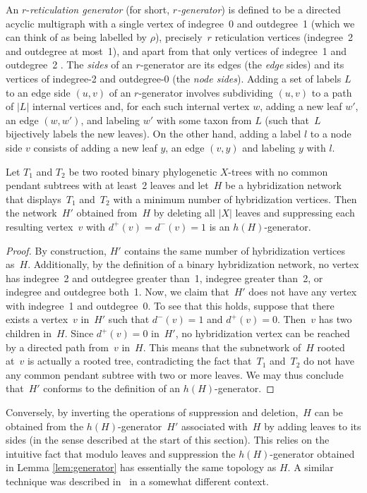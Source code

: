 An $r$-\emph{reticulation generator} (for short, {\it $r$-generator}) is defined to be a directed acyclic multigraph with  a single vertex of indegree~0 and  outdegree~1 {(which we can think of as being labelled by $\rho$)}, precisely~$r$ reticulation vertices (indegree~2 and outdegree at most~1), and apart from that only vertices of indegree~1 and outdegree~2 \cite{KelkScornavacca2011}.  The \emph{sides} of an $r$-generator are its edges (the \emph{edge} sides) and its vertices of indegree-2 and outdegree-0 (the \emph{node sides}). Adding a set of labels $L$ to an edge side $(u, v)$ of an $r$-generator involves subdividing $(u, v)$ to a path of $|L|$ internal vertices and, for each such internal vertex $w$, adding a new leaf $w'$, an edge $(w, w')$, and labeling $w'$ with some taxon from $L$ (such that~$L$ bijectively labels the new leaves). On the other hand, adding a label $l$ to a node side $v$ consists of adding a new leaf $y$, an edge $(v, y)$ and labeling $y$ with $l$.

\begin{lemma}\label{lem:generator}
Let $T_1$ and $T_2$ be two rooted binary phylogenetic $X$-trees with no common pendant subtrees with at least~2 leaves and let~$H$ be a hybridization network that displays~$T_1$ and~$T_2$ with a minimum number of hybridization vertices. Then the network~$H'$ obtained from~$H$ by deleting all {$|X|$} leaves and suppressing each resulting vertex~$v$ with $d^+(v)=d^-(v)=1$ is an $h(H)$-generator.
\end{lemma}
\begin{proof}
By construction, $H'$ contains the same number of hybridization vertices as~$H$. Additionally,
by the definition of a binary hybridization network, no vertex has indegree~2 and outdegree greater than~1, indegree greater than~2, or indegree and outdegree both~1. Now, we claim that~$H'$ does not have any vertex with indegree~1 and outdegree~0. To see that this holds, suppose that there exists a vertex~$v$ in~$H'$ such that $d^-(v)= 1$ and $d^+(v)= 0$. Then~$v$ has two children in~$H$. Since $d^+(v)= 0$ in~$H'$, no hybridization vertex can be reached by a directed path from~$v$ in~$H$. This means that the subnetwork of~$H$ rooted at~$v$ is actually a rooted tree, contradicting the fact that~$T_1$ and~$T_2$ do not have any common pendant subtree with two or more leaves. We may thus conclude that~$H'$ conforms to the definition of an $h(H)$-generator.
\end{proof}

Conversely, by inverting the operations of suppression and deletion,~$H$ can be obtained from the $h(H)$-generator~$H'$ associated with~$H$ by adding leaves to its sides (in the sense described at the start of this section).
{This relies on the intuitive fact that modulo leaves and suppression the $h(H)$-generator obtained in Lemma \ref{lem:generator} has essentially the same topology as $H$. A similar technique was described in~\cite{KelkScornavacca2011} in a somewhat different context.}\\

